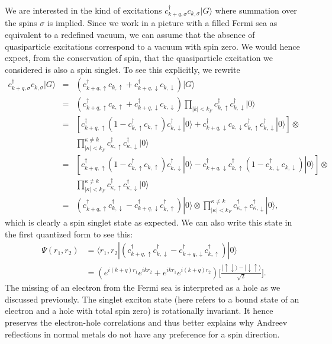 \documentclass[12pt,letterpaper,aps,onecolumn,superscriptaddress,floatfix,notitlepage]{revtex4-1}
\begin{document}
	We are interested in the kind of excitations $c_{k+q,\sigma}^{\dagger}c_{k,\sigma}|G\rangle$ where summation over the spins $\sigma$ is implied. Since we work in a picture with a filled Fermi sea as equivalent to a redefined vacuum, we can assume that the absence of quasiparticle excitations correspond to a vacuum with spin zero. We would hence expect, from the conservation of spin, that the quasiparticle excitation we considered is also a spin singlet. To see this explicitly, we rewrite 
	\begin{eqnarray}
	\label{exc}	c_{k+q,\sigma}^{\dagger}c_{k,\sigma}|G\rangle &=& (c_{k+q,\uparrow}^{\dagger}c_{k,\uparrow} +  c_{k+q,\downarrow}^{\dagger}c_{k,\downarrow})|G\rangle \nonumber\\
	& = & (c_{k+q,\uparrow}^{\dagger}c_{k,\uparrow} +  c_{k+q,\downarrow}^{\dagger}c_{k,\downarrow})\prod_{|k|<k_{F}}c_{k,\uparrow}^{\dagger}c_{k,\downarrow}^{\dagger}|0\rangle\\
	&=&[c_{k+q,\uparrow}^{\dagger}(1-c_{k,\uparrow}^{\dagger}c_{k,\uparrow})c_{k,\downarrow}^{\dagger}|0\rangle +  c_{k+q,\downarrow}^{\dagger}c_{k,\downarrow}c_{k,\uparrow}^{\dagger}c_{k,\downarrow}^{\dagger}|0\rangle]\otimes\nonumber\\
	&&\prod^{\kappa\neq k}_{|\kappa|<k_{F}}c_{\kappa,\uparrow}^{\dagger}c_{\kappa,\downarrow}^{\dagger}|0\rangle  \\
	&=&[c_{k+q,\uparrow}^{\dagger}(1-c_{k,\uparrow}^{\dagger}c_{k,\uparrow})c_{k,\downarrow}^{\dagger}|0\rangle -  c_{k+q,\downarrow}^{\dagger}c_{k,\uparrow}^{\dagger}(1-c_{k,\downarrow}^{\dagger}c_{k,\downarrow})|0\rangle]\otimes\nonumber\\
	&&\prod^{\kappa\neq k}_{|\kappa|<k_{F}}c_{\kappa,\uparrow}^{\dagger}c_{\kappa,\downarrow}^{\dagger}|0\rangle\\
	&=&(c_{k+q,\uparrow}^{\dagger}c_{k,\downarrow}^{\dagger} -  c_{k+q,\downarrow}^{\dagger}c_{k,\uparrow}^{\dagger})|0\rangle\otimes\prod^{\kappa\neq k}_{|\kappa|<k_{F}}c_{\kappa,\uparrow}^{\dagger}c_{\kappa,\downarrow}^{\dagger}|0\rangle,
	\end{eqnarray}	
	which is clearly a spin singlet state as expected. We can also write this state in the first quantized form to see this:
	\begin{align}
	\Psi(r_{1},r_{2}) &= \langle r_{1},r_{2}|(c_{k+q,\uparrow}^{\dagger}c_{k,\downarrow}^{\dagger} -  c_{k+q,\downarrow}^{\dagger}c_{k,\uparrow}^{\dagger})|0\rangle \nonumber\\
	&= (e^{i(k+q)r_{1}}e^{ikr_{2}}+e^{ikr_{1}}e^{i(k+q)r_{2}})\bigg[\frac{|\uparrow\downarrow\rangle-|\downarrow\uparrow\rangle}{\sqrt{2}}\bigg].
	\end{align}	
	The missing of an electron from the Fermi sea is interpreted as a hole as we discussed previously. 	The singlet exciton state (here refers to a bound state of an electron and a hole with total spin zero) is rotationally invariant. It hence preserves the electron-hole correlations and thus better explains why Andreev reflections in normal metals do not have any preference for a spin direction.
\end{document}
